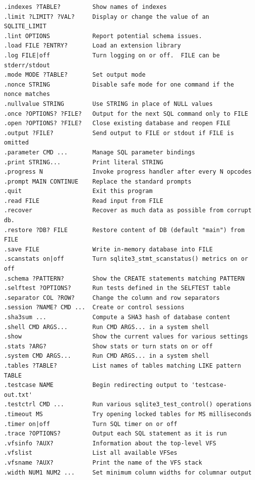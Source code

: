 \begin{verbatim}
.indexes ?TABLE?         Show names of indexes
.limit ?LIMIT? ?VAL?     Display or change the value of an SQLITE_LIMIT
.lint OPTIONS            Report potential schema issues.
.load FILE ?ENTRY?       Load an extension library
.log FILE|off            Turn logging on or off.  FILE can be stderr/stdout
.mode MODE ?TABLE?       Set output mode
.nonce STRING            Disable safe mode for one command if the nonce matches
.nullvalue STRING        Use STRING in place of NULL values
.once ?OPTIONS? ?FILE?   Output for the next SQL command only to FILE
.open ?OPTIONS? ?FILE?   Close existing database and reopen FILE
.output ?FILE?           Send output to FILE or stdout if FILE is omitted
.parameter CMD ...       Manage SQL parameter bindings
.print STRING...         Print literal STRING
.progress N              Invoke progress handler after every N opcodes
.prompt MAIN CONTINUE    Replace the standard prompts
.quit                    Exit this program
.read FILE               Read input from FILE
.recover                 Recover as much data as possible from corrupt db.
.restore ?DB? FILE       Restore content of DB (default "main") from FILE
.save FILE               Write in-memory database into FILE
.scanstats on|off        Turn sqlite3_stmt_scanstatus() metrics on or off
.schema ?PATTERN?        Show the CREATE statements matching PATTERN
.selftest ?OPTIONS?      Run tests defined in the SELFTEST table
.separator COL ?ROW?     Change the column and row separators
.session ?NAME? CMD ...  Create or control sessions
.sha3sum ...             Compute a SHA3 hash of database content
.shell CMD ARGS...       Run CMD ARGS... in a system shell
.show                    Show the current values for various settings
.stats ?ARG?             Show stats or turn stats on or off
.system CMD ARGS...      Run CMD ARGS... in a system shell
.tables ?TABLE?          List names of tables matching LIKE pattern TABLE
.testcase NAME           Begin redirecting output to 'testcase-out.txt'
.testctrl CMD ...        Run various sqlite3_test_control() operations
.timeout MS              Try opening locked tables for MS milliseconds
.timer on|off            Turn SQL timer on or off
.trace ?OPTIONS?         Output each SQL statement as it is run
.vfsinfo ?AUX?           Information about the top-level VFS
.vfslist                 List all available VFSes
.vfsname ?AUX?           Print the name of the VFS stack
.width NUM1 NUM2 ...     Set minimum column widths for columnar output
\end{verbatim}
\endgroup
